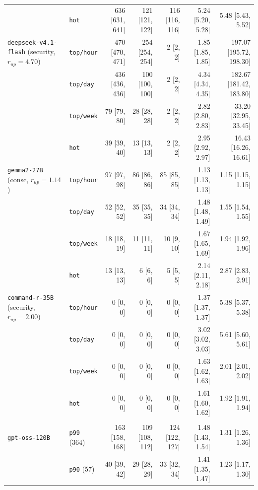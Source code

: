 \begin{table}
\begin{tabular}{@{}l l r r r r r@{}}
 & \texttt{hot} & 636 [631{,} 641] & 121 [121{,} 122] & 116 [116{,} 116] & 5.24 [5.20{,} 5.28] & 5.48 [5.43{,} 5.52]\\
\addlinespace
\texttt{deepseek-v4.1-flash} (security, $r_{up}{=}4.70$) & \texttt{top/hour} & 470 [470{,} 471] & 254 [254{,} 254] & 2 [2{,} 2] & 1.85 [1.85{,} 1.85] & 197.07 [195.72{,} 198.30]\\
 & \texttt{top/day} & 436 [436{,} 436] & 100 [100{,} 100] & 2 [2{,} 2] & 4.34 [4.34{,} 4.35] & 182.67 [181.42{,} 183.80]\\
 & \texttt{top/week} & 79 [79{,} 80] & 28 [28{,} 28] & 2 [2{,} 2] & 2.82 [2.80{,} 2.83] & 33.20 [32.95{,} 33.45]\\
 & \texttt{hot} & 39 [39{,} 40] & 13 [13{,} 13] & 2 [2{,} 2] & 2.95 [2.92{,} 2.97] & 16.43 [16.26{,} 16.61]\\
\addlinespace
\texttt{gemma2-27B} (consc, $r_{up}{=}1.14$) & \texttt{top/hour} & 97 [97{,} 98] & 86 [86{,} 86] & 85 [85{,} 85] & 1.13 [1.13{,} 1.13] & 1.15 [1.15{,} 1.15]\\
 & \texttt{top/day} & 52 [52{,} 52] & 35 [35{,} 35] & 34 [34{,} 34] & 1.48 [1.48{,} 1.49] & 1.55 [1.54{,} 1.55]\\
 & \texttt{top/week} & 18 [18{,} 19] & 11 [11{,} 11] & 10 [9{,} 10] & 1.67 [1.65{,} 1.69] & 1.94 [1.92{,} 1.96]\\
 & \texttt{hot} & 13 [13{,} 13] & 6 [6{,} 6] & 5 [5{,} 5] & 2.14 [2.11{,} 2.18] & 2.87 [2.83{,} 2.91]\\
\addlinespace
\texttt{command-r-35B} (security, $r_{up}{=}2.00$) & \texttt{top/hour} & 0 [0{,} 0] & 0 [0{,} 0] & 0 [0{,} 0] & 1.37 [1.37{,} 1.37] & 5.38 [5.37{,} 5.38]\\
 & \texttt{top/day} & 0 [0{,} 0] & 0 [0{,} 0] & 0 [0{,} 0] & 3.02 [3.02{,} 3.03] & 5.61 [5.60{,} 5.61]\\
 & \texttt{top/week} & 0 [0{,} 0] & 0 [0{,} 0] & 0 [0{,} 0] & 1.63 [1.62{,} 1.63] & 2.01 [2.01{,} 2.02]\\
 & \texttt{hot} & 0 [0{,} 0] & 0 [0{,} 0] & 0 [0{,} 0] & 1.61 [1.60{,} 1.62] & 1.92 [1.91{,} 1.94]\\
\addlinespace
\multicolumn{7}{@{}l}{\emph{Edge-mediated follower cascade (by seed follower count)}}\\
\texttt{gpt-oss-120B} & \texttt{p99} (364) & 163 [158{,} 168] & 109 [108{,} 112] & 124 [122{,} 127] & 1.48 [1.43{,} 1.54] & 1.31 [1.26{,} 1.36]\\
 & \texttt{p90} (57) & 40 [39{,} 42] & 29 [28{,} 29] & 33 [32{,} 34] & 1.41 [1.35{,} 1.47] & 1.23 [1.17{,} 1.30]\\

\end{tabular}
\end{table}
